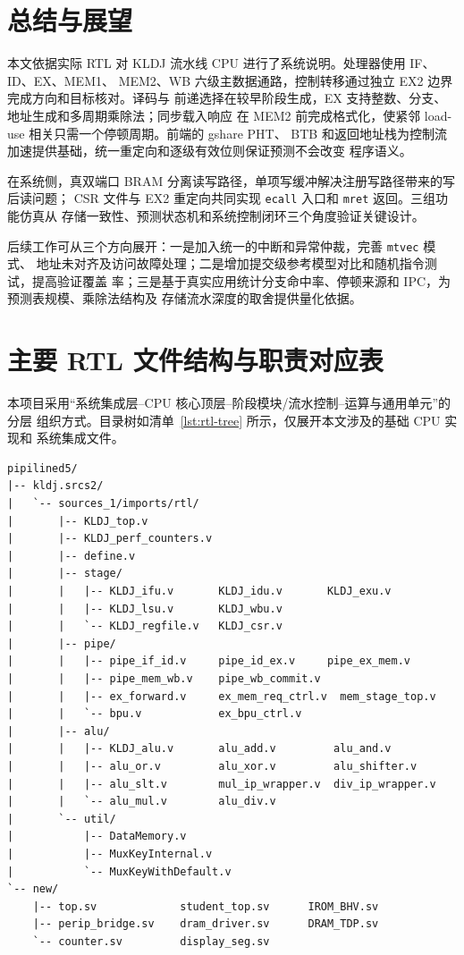 \documentclass[UTF8,zihao=-4,a4paper]{ctexart}
\numberwithin{table}{section}
\numberwithin{figure}{section}
\newcommand{\code}[1]{\texttt{#1}}
\begin{document}
\section{总结与展望}

本文依据实际 RTL 对 KLDJ 流水线 CPU 进行了系统说明。处理器使用 IF、ID、EX、MEM1、
MEM2、WB 六级主数据通路，控制转移通过独立 EX2 边界完成方向和目标核对。译码与
前递选择在较早阶段生成，EX 支持整数、分支、地址生成和多周期乘除法；同步载入响应
在 MEM2 前完成格式化，使紧邻 load-use 相关只需一个停顿周期。前端的 gshare PHT、
BTB 和返回地址栈为控制流加速提供基础，统一重定向和逐级有效位则保证预测不会改变
程序语义。

在系统侧，真双端口 BRAM 分离读写路径，单项写缓冲解决注册写路径带来的写后读问题；
CSR 文件与 EX2 重定向共同实现 \code{ecall} 入口和 \code{mret} 返回。三组功能仿真从
存储一致性、预测状态机和系统控制闭环三个角度验证关键设计。

后续工作可从三个方向展开：一是加入统一的中断和异常仲裁，完善 \code{mtvec} 模式、
地址未对齐及访问故障处理；二是增加提交级参考模型对比和随机指令测试，提高验证覆盖
率；三是基于真实应用统计分支命中率、停顿来源和 IPC，为预测表规模、乘除法结构及
存储流水深度的取舍提供量化依据。

\appendix
\section{主要 RTL 文件结构与职责对应表}

本项目采用“系统集成层--CPU 核心顶层--阶段模块/流水控制--运算与通用单元”的分层
组织方式。目录树如清单~\ref{lst:rtl-tree} 所示，仅展开本文涉及的基础 CPU 实现和
系统集成文件。

\begin{lstlisting}[caption={项目 RTL 目录层次},label={lst:rtl-tree},numbers=none,basicstyle=\ttfamily\footnotesize]
pipilined5/
|-- kldj.srcs2/
|   `-- sources_1/imports/rtl/
|       |-- KLDJ_top.v
|       |-- KLDJ_perf_counters.v
|       |-- define.v
|       |-- stage/
|       |   |-- KLDJ_ifu.v       KLDJ_idu.v       KLDJ_exu.v
|       |   |-- KLDJ_lsu.v       KLDJ_wbu.v
|       |   `-- KLDJ_regfile.v   KLDJ_csr.v
|       |-- pipe/
|       |   |-- pipe_if_id.v     pipe_id_ex.v     pipe_ex_mem.v
|       |   |-- pipe_mem_wb.v    pipe_wb_commit.v
|       |   |-- ex_forward.v     ex_mem_req_ctrl.v  mem_stage_top.v
|       |   `-- bpu.v            ex_bpu_ctrl.v
|       |-- alu/
|       |   |-- KLDJ_alu.v       alu_add.v         alu_and.v
|       |   |-- alu_or.v         alu_xor.v         alu_shifter.v
|       |   |-- alu_slt.v        mul_ip_wrapper.v  div_ip_wrapper.v
|       |   `-- alu_mul.v        alu_div.v
|       `-- util/
|           |-- DataMemory.v
|           |-- MuxKeyInternal.v
|           `-- MuxKeyWithDefault.v
`-- new/
    |-- top.sv             student_top.sv      IROM_BHV.sv
    |-- perip_bridge.sv    dram_driver.sv      DRAM_TDP.sv
    `-- counter.sv         display_seg.sv
\end{lstlisting}
\end{document}
